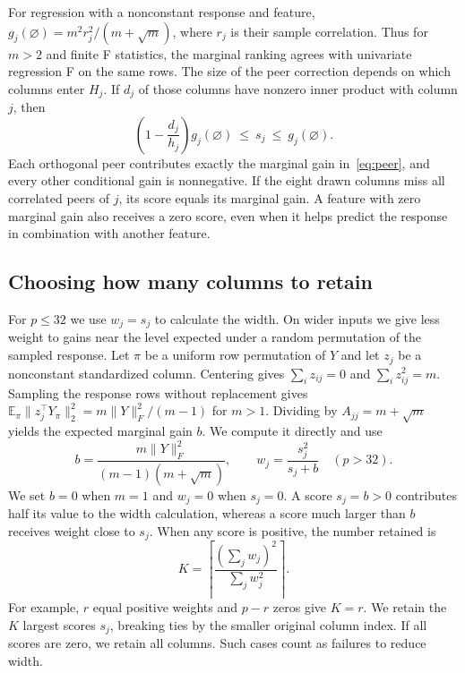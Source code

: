 \documentclass[11pt,a4paper]{article}
\newcommand{\gain}{g}
\begin{document}
For regression with a nonconstant response and feature, $\gain_j(\varnothing)=m^2r_j^2/(m+\sqrt m)$, where $r_j$ is their sample correlation. Thus for $m>2$ and finite F statistics, the marginal ranking agrees with univariate regression F on the same rows. The size of the peer correction depends on which columns enter $H_j$. If $d_j$ of those columns have nonzero inner product with column $j$, then
\begin{equation}
 \left(1-\frac{d_j}{h_j}\right)\gain_j(\varnothing)
 \ \le\ s_j\ \le\ \gain_j(\varnothing).\label{eq:bound}
\end{equation}
Each orthogonal peer contributes exactly the marginal gain in~\eqref{eq:peer}, and every other conditional gain is nonnegative. If the eight drawn columns miss all correlated peers of $j$, its score equals its marginal gain. A feature with zero marginal gain also receives a zero score, even when it helps predict the response in combination with another feature.

\subsection{Choosing how many columns to retain}
For $p\le32$ we use $w_j=s_j$ to calculate the width. On wider inputs we give less weight to gains near the level expected under a random permutation of the sampled response. Let $\pi$ be a uniform row permutation of $Y$ and let $z_j$ be a nonconstant standardized column. Centering gives $\sum_i z_{ij}=0$ and $\sum_i z_{ij}^2=m$. Sampling the response rows without replacement gives $\mathbb{E}_\pi\|z_j^\top Y_\pi\|_2^2=m\|Y\|_F^2/(m-1)$ for $m>1$. Dividing by $A_{jj}=m+\sqrt m$ yields the expected marginal gain $b$. We compute it directly and use
\begin{equation}
 b=\frac{m\|Y\|_F^2}{(m-1)(m+\sqrt m)},\qquad
 w_j=\frac{s_j^2}{s_j+b}\quad(p>32).\label{eq:null}
\end{equation}
We set $b=0$ when $m=1$ and $w_j=0$ when $s_j=0$. A score $s_j=b>0$ contributes half its value to the width calculation, whereas a score much larger than $b$ receives weight close to $s_j$. When any score is positive, the number retained is
\begin{equation}
 K=\left\lceil\frac{(\sum_j w_j)^2}{\sum_j w_j^2}\right\rceil.\label{eq:width}
\end{equation}
For example, $r$ equal positive weights and $p-r$ zeros give $K=r$. We retain the $K$ largest scores $s_j$, breaking ties by the smaller original column index. If all scores are zero, we retain all columns. Such cases count as failures to reduce width.
\end{document}

